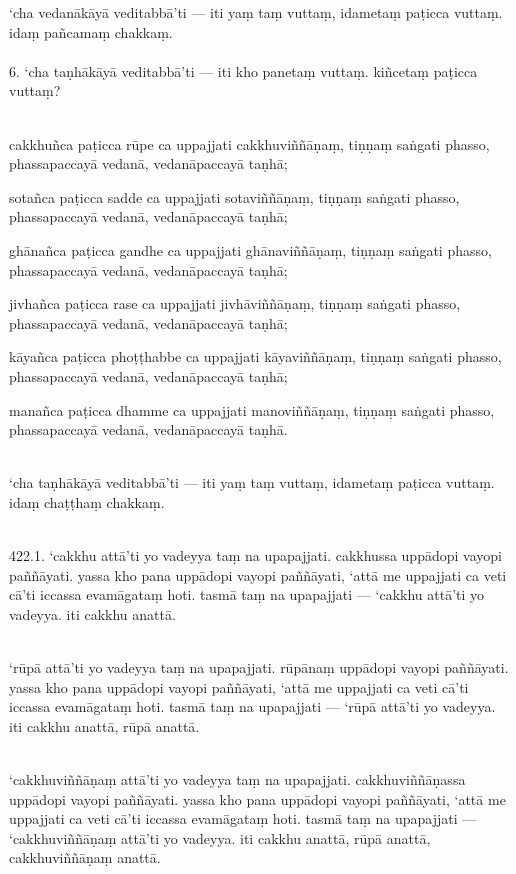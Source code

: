 \documentclass[9pt]{article}
\begin{document}
‘cha vedanākāyā veditabbā’ti — iti yaṃ taṃ vuttaṃ, idametaṃ paṭicca vuttaṃ. idaṃ pañcamaṃ chakkaṃ.\\\
\pagebreak\\
6. ‘cha taṇhākāyā veditabbā’ti — iti kho panetaṃ vuttaṃ. kiñcetaṃ paṭicca vuttaṃ?\\\

cakkhuñca paṭicca rūpe ca uppajjati cakkhuviññāṇaṃ, tiṇṇaṃ saṅgati phasso, phassapaccayā vedanā, vedanāpaccayā taṇhā;\

sotañca paṭicca sadde ca uppajjati sotaviññāṇaṃ, tiṇṇaṃ saṅgati phasso, phassapaccayā vedanā, vedanāpaccayā taṇhā;\

ghānañca paṭicca gandhe ca uppajjati ghānaviññāṇaṃ, tiṇṇaṃ saṅgati phasso, phassapaccayā vedanā, vedanāpaccayā taṇhā;\

jivhañca paṭicca rase ca uppajjati jivhāviññāṇaṃ, tiṇṇaṃ saṅgati phasso, phassapaccayā vedanā, vedanāpaccayā taṇhā;\

kāyañca paṭicca phoṭṭhabbe ca uppajjati kāyaviññāṇaṃ, tiṇṇaṃ saṅgati phasso, phassapaccayā vedanā, vedanāpaccayā taṇhā;\

manañca paṭicca dhamme ca uppajjati manoviññāṇaṃ, tiṇṇaṃ saṅgati phasso, phassapaccayā vedanā, vedanāpaccayā taṇhā.\\\

‘cha taṇhākāyā veditabbā’ti — iti yaṃ taṃ vuttaṃ, idametaṃ paṭicca vuttaṃ. idaṃ chaṭṭhaṃ chakkaṃ.\\\

422.1. ‘cakkhu attā’ti yo vadeyya taṃ na upapajjati. cakkhussa uppādopi vayopi paññāyati. yassa kho pana uppādopi vayopi paññāyati, ‘attā me uppajjati ca veti cā’ti iccassa evamāgataṃ hoti. tasmā taṃ na upapajjati — ‘cakkhu attā’ti yo vadeyya. iti cakkhu anattā.\\\

‘rūpā attā’ti yo vadeyya taṃ na upapajjati. rūpānaṃ uppādopi vayopi paññāyati. yassa kho pana uppādopi vayopi paññāyati, ‘attā me uppajjati ca veti cā’ti iccassa evamāgataṃ hoti. tasmā taṃ na upapajjati — ‘rūpā attā’ti yo vadeyya. iti cakkhu anattā, rūpā anattā.\\\

‘cakkhuviññāṇaṃ attā’ti yo vadeyya taṃ na upapajjati. cakkhuviññāṇassa uppādopi vayopi paññāyati. yassa kho pana uppādopi vayopi paññāyati, ‘attā me uppajjati ca veti cā’ti iccassa evamāgataṃ hoti. tasmā taṃ na upapajjati — ‘cakkhuviññāṇaṃ attā’ti yo vadeyya. iti cakkhu anattā, rūpā anattā, cakkhuviññāṇaṃ anattā.\\\
\end{document}
